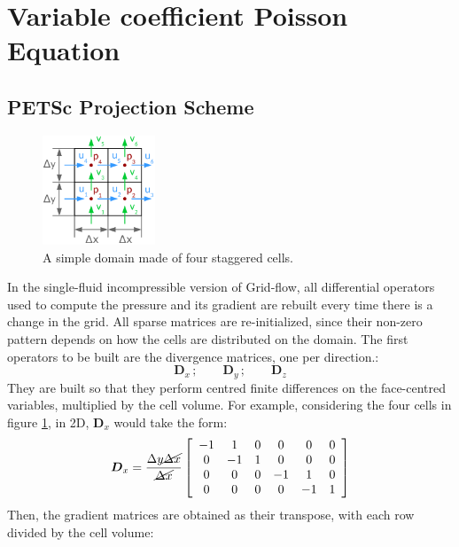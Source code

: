 \documentclass[11pt, a4paper, oneside, openany]{book}
\begin{document}
\section{Variable coefficient Poisson Equation}\label{Chapter_Implementation_Variable_Coefficient_Poisson_Equation}
\subsection{PETSc Projection Scheme}\label{Subsection_PETSc_projection_scheme}
\begin{figure}[!ht]
	\centering
	\includegraphics[width=0.3\textwidth]{StaggeredGrid4.pdf}
	\caption[Staggered Grid 4 cells]{A simple domain made of four staggered cells.}\label{StaggeredGrid4}
\end{figure}\noindent
In the single-fluid incompressible version of Grid-flow, all differential operators used to compute the pressure and its gradient are rebuilt every time there is a change in the grid. All sparse matrices are re-initialized, since their non-zero pattern depends on how the cells are distributed on the domain. 
The first operators to be built are the divergence matrices, one per direction.:
\begin{equation*}
\boldsymbol{D}_{x}\,;\qquad\boldsymbol{D}_{y}\,;\qquad\boldsymbol{D}_{z}
\end{equation*}
They are built so that they perform centred finite differences on the face-centred variables, multiplied by the cell volume. For example, considering the four cells in figure \ref{StaggeredGrid4}, in 2D, $\boldsymbol{D}_{x}$ would take the form:
\begin{equation*}
\boldsymbol{D}_{x}=\dfrac{\Delta y\cancel{\Delta x}}{\cancel{\Delta x}}\left[\begin{array}{cccccc}
-1 & 1 & 0 & 0 & 0 & 0\\
0 & -1 & 1 & 0 & 0 & 0\\
0 & 0 & 0 & -1 & 1 & 0\\
0 & 0 & 0 & 0 & -1 & 1
\end{array}\right]
\end{equation*}
Then, the gradient matrices are obtained as their transpose, with each row divided by the cell volume:
\end{document}
